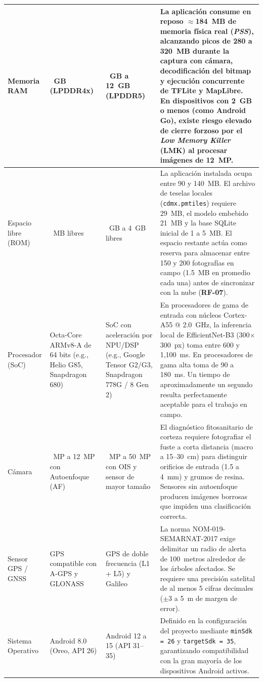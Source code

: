 \begin{longtable}{|>{\raggedright\arraybackslash}m{2.8cm}|>{\raggedright\arraybackslash}m{2.6cm}|>{\raggedright\arraybackslash}m{2.6cm}|>{\raggedright\arraybackslash}m{5.8cm}|}
Memoria RAM & 3~GB (LPDDR4x) & 6~GB a 12~GB (LPDDR5) & La aplicación consume en reposo $\approx$184~MB de memoria física real (\textit{PSS}), alcanzando picos de 280 a 320~MB durante la captura con cámara, decodificación del bitmap y ejecución concurrente de TFLite y MapLibre. En dispositivos con 2~GB o menos (como Android Go), existe riesgo elevado de cierre forzoso por el \textit{Low Memory Killer} (LMK) al procesar imágenes de 12~MP. \\
\hline
Espacio libre (ROM) & 500~MB libres & 2~GB a 4~GB libres & La aplicación instalada ocupa entre 90 y 140~MB. El archivo de teselas locales (\texttt{cdmx.pmtiles}) requiere 29~MB, el modelo embebido 21~MB y la base SQLite inicial de 1 a 5~MB. El espacio restante actúa como reserva para almacenar entre 150 y 200 fotografías en campo (1.5~MB en promedio cada una) antes de sincronizar con la nube (\textbf{RF-07}). \\
\hline
Procesador (SoC) & Octa-Core ARMv8-A de 64 bits (e.g., Helio G85, Snapdragon 680) & SoC con aceleración por NPU/DSP (e.g., Google Tensor G2/G3, Snapdragon 778G / 8 Gen 2) & En procesadores de gama de entrada con núcleos Cortex-A55 @ 2.0~GHz, la inferencia local de EfficientNet-B3 (300$\times$300~px) toma entre 600 y 1,100~ms. En procesadores de gama alta toma de 90 a 180~ms. Un tiempo de aproximadamente un segundo resulta perfectamente aceptable para el trabajo en campo. \\
\hline
Cámara & 8~MP a 12~MP con Autoenfoque (AF) & 12~MP a 50~MP con OIS y sensor de mayor tamaño & El diagnóstico fitosanitario de corteza requiere fotografiar el fuste a corta distancia (macro a 15--30~cm) para distinguir orificios de entrada (1.5 a 4~mm) y grumos de resina. Sensores sin autoenfoque producen imágenes borrosas que impiden una clasificación correcta. \\
\hline
Sensor GPS / GNSS & GPS compatible con A-GPS y GLONASS & GPS de doble frecuencia (L1 + L5) y Galileo & La norma NOM-019-SEMARNAT-2017 exige delimitar un radio de alerta de 100~metros alrededor de los árboles afectados. Se requiere una precisión satelital de al menos 5 cifras decimales ($\pm$3 a 5~m de margen de error). \\
\hline
Sistema Operativo & Android 8.0 (Oreo, API 26) & Android 12 a 15 (API 31--35) & Definido en la configuración del proyecto mediante \texttt{minSdk = 26} y \texttt{targetSdk = 35}, garantizando compatibilidad con la gran mayoría de los dispositivos Android activos. \\
\hline
\end{longtable}


